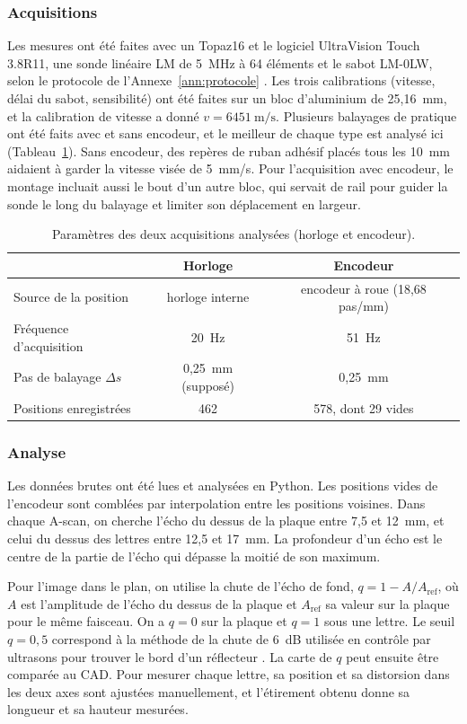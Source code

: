 \documentclass[11pt,letterpaper]{article}
\begin{document}
\subsubsection*{Acquisitions}
Les mesures ont été faites avec un Topaz16 et le logiciel UltraVision Touch 3.8R11, une sonde linéaire LM de 5~MHz à 64 éléments et le sabot LM-0LW, selon le protocole de l'Annexe~\ref{ann:protocole} \cite{protocole_topaz}. Les trois calibrations (vitesse, délai du sabot, sensibilité) ont été faites sur un bloc d'aluminium de 25,16~mm, et la calibration de vitesse a donné $v = 6451~\text{m/s}$. Plusieurs balayages de pratique ont été faits avec et sans encodeur, et le meilleur de chaque type est analysé ici (Tableau~\ref{tab:acquisitions}). Sans encodeur, des repères de ruban adhésif placés tous les 10~mm aidaient à garder la vitesse visée de 5~mm/s. Pour l'acquisition avec encodeur, le montage incluait aussi le bout d'un autre bloc, qui servait de rail pour guider la sonde le long du balayage et limiter son déplacement en largeur.

\begin{table}[htbp]
\centering
\caption{Paramètres des deux acquisitions analysées (horloge et encodeur).}
\label{tab:acquisitions}
\small
\begin{tabular}{lcc}
\hline
 & Horloge & Encodeur \\
\hline
Source de la position & horloge interne & encodeur à roue (18,68 pas/mm) \\
Fréquence d'acquisition & 20~Hz & 51~Hz \\
Pas de balayage $\Delta s$ & 0,25~mm (supposé) & 0,25~mm \\
Positions enregistrées & 462 & 578, dont 29 vides \\
\hline
\end{tabular}
\end{table}

\subsubsection*{Analyse}
Les données brutes ont été lues et analysées en Python. Les positions vides de l'encodeur sont comblées par interpolation entre les positions voisines. Dans chaque A-scan, on cherche l'écho du dessus de la plaque entre 7,5 et 12~mm, et celui du dessus des lettres entre 12,5 et 17~mm. La profondeur d'un écho est le centre de la partie de l'écho qui dépasse la moitié de son maximum.

Pour l'image dans le plan, on utilise la chute de l'écho de fond, $q = 1 - A/A_{\text{ref}}$, où $A$ est l'amplitude de l'écho du dessus de la plaque et $A_{\text{ref}}$ sa valeur sur la plaque pour le même faisceau. On a $q = 0$ sur la plaque et $q = 1$ sous une lettre. Le seuil $q = 0{,}5$ correspond à la méthode de la chute de 6~dB utilisée en contrôle par ultrasons pour trouver le bord d'un réflecteur \cite{krautkramer}. La carte de $q$ peut ensuite être comparée au CAD. Pour mesurer chaque lettre, sa position et sa distorsion dans les deux axes sont ajustées manuellement, et l'étirement obtenu donne sa longueur et sa hauteur mesurées.
\end{document}
